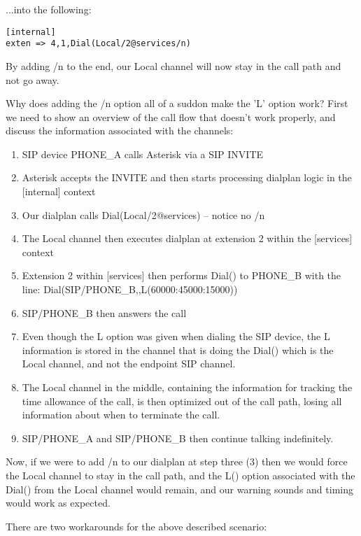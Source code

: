 ...into the following:

\begin{verbatim}
[internal]
exten => 4,1,Dial(Local/2@services/n)
\end{verbatim}

By adding /n to the end, our Local channel will now stay in the call path and
not go away.

Why does adding the /n option all of a suddon make the 'L' option work? First
we need to show an overview of the call flow that doesn't work properly, and
discuss the information associated with the channels:

\begin{enumerate}
  \item SIP device PHONE\_A calls Asterisk via a SIP INVITE
  \item Asterisk accepts the INVITE and then starts processing dialplan logic in the [internal] context
  \item Our dialplan calls Dial(Local/2@services) -- notice no /n
  \item The Local channel then executes dialplan at extension 2 within the [services] context
  \item Extension 2 within [services] then performs Dial() to PHONE\_B with the line:  Dial(SIP/PHONE\_B,,L(60000:45000:15000))
  \item SIP/PHONE\_B then answers the call
  \item Even though the L option was given when dialing the SIP device, the L information is stored in the channel that is doing the Dial() which is the Local channel, and not the endpoint SIP channel.
  \item The Local channel in the middle, containing the information for tracking the time allowance of the call, is then optimized out of the call path, losing all information about when to terminate the call.
  \item SIP/PHONE\_A and SIP/PHONE\_B then continue talking indefinitely.
\end{enumerate}

Now, if we were to add /n to our dialplan at step three (3) then we would force the
Local channel to stay in the call path, and the L() option associated with the
Dial() from the Local channel would remain, and our warning sounds and timing
would work as expected.

There are two workarounds for the above described scenario:

